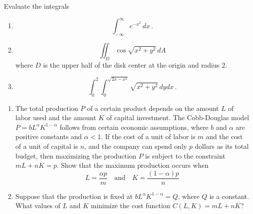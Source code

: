 \documentclass[12pt]{amsart}
\begin{document}
\newpage

\begin{problem}
Evaluate the integrals
\begin{enumerate}
	\item \begin{equation*}
		      \int_{-\infty}^\infty e^{-x^2} \, dx \,.
	      \end{equation*}
	      \vspace{8cm}

	\item \begin{equation*}
		      \iint_D \cos\sqrt{x^2 + y^2} \, dA
	      \end{equation*}
	      where $D$ is the upper half of the disk center at the origin and radius 2.
	      \vspace{8cm}

	\item \begin{equation*}
		      \int_0^2 \int_0^{\sqrt{2x - x^2}} \sqrt{x^2 + y^2} \, dy dx \,.
	      \end{equation*}
\end{enumerate}
\end{problem}
\newpage

\begin{problem}
\begin{enumerate}
	\item
	      The total production $P$ of a certain product depends on the amount $L$ of labor used and the amount $K$ of capital investment.
	      The Cobb-Douglas model $P = bL^{\alpha}K^{1-\alpha}$ follows from certain economic assumptions, where $b$ and $\alpha$ are positive constants and $\alpha < 1$. If the cost of a unit of labor is $m$ and the cost of a unit of capital is $n$, and the company can spend only $p$ dollars as its total budget, then maximizing the production $P$ is subject to the constraint $mL + nK = p$. Show that the maximum production occurs when
	      \[
		      L = \frac{\alpha p}{m} \quad \text{and} \quad K = \frac{(1 - \alpha)p}{n}
	      \]
	      \newpage

	\item Suppose that the production is fixed at $bL^{\alpha}K^{1-\alpha} = Q$, where $Q$ is a constant. What values of $L$ and $K$ minimize the cost function $C(L, K) = mL + nK$?
\end{enumerate}
\end{problem}









\printbibliography
%
%
\end{document}
